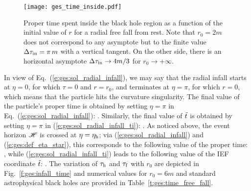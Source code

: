 \begin{figure}
\centerline{\texttt{[image: ges\_time\_inside.pdf]}}
\caption[]{\label{f:ges:time_inside} \footnotesize
Proper time spent inside the black hole region as a function
of the initial value of $r$ for a radial free fall from rest.
Note that $r_0=2m$ does not correspond to any asymptote but to the
finite value $\Delta\tau_{\rm in} = \pi\, m$ with a vertical tangent.
On the other side, there is an horizontal asymptote
$\Delta\tau_{\rm in} \to 4m/3$ for $r_0\to +\infty$.}
\end{figure}

In view of Eq.~(\ref{e:ges:sol_radial_infall}), we may say that the radial
infall starts at $\eta=0$, for which $\tau=0$ and $r=r_0$, and terminates
at $\eta=\pi$, for which $r=0$, which means that the particle hits the curvature
singularity. The final value of the particle's proper time is obtained by
setting $\eta=\pi$ in Eq.~(\ref{e:ges:sol_radial_infall}):
\be
     .
\ee
Similarly, the final value of ${\tilde t}$ is obtained by setting $\eta=\pi$ in (\ref{e:ges:sol_radial_infall_ti}):
\be
     .
\ee
As noticed above, the event horizon $\mathscr{H}$ is crossed at $\eta=\eta_{\rm h}$;
via (\ref{e:ges:sol_radial_infall}) and (\ref{e:ges:def_eta_star}), this corresponds to the following value
of the proper time:
\be
     ,
\ee
while (\ref{e:ges:sol_radial_infall_ti}) leads to the following value
of the IEF coordinate ${\tilde t}$:
\be
     .
\ee
The variation of $\tau_{\rm h}$ and $\tau_{\rm f}$ with $r_0$ are depicted in
Fig.~\ref{f:ges:infall_time} and numerical values for $r_0=6m$ and
standard astrophysical black holes are provided in
Table~\ref{t:ges:time_free_fall}.

